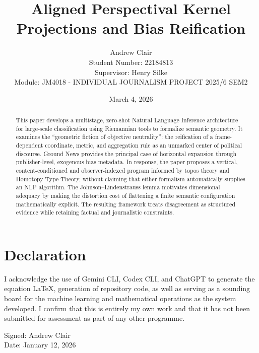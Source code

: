 \documentclass[12pt]{article}
\title{Aligned Perspectival Kernel Projections and Bias Reification}
\author{Andrew Clair \\
Student Number: 22184813 \\
Supervisor: Henry Silke \\
Module: JM4018 - INDIVIDUAL JOURNALISM PROJECT 2025/6 SEM2}
\date{March 4, 2026}
\begin{document}
\maketitle

\begin{abstract}
This paper develops a multistage, zero-shot Natural Language Inference architecture for large-scale classification using Riemannian tools to formalize semantic geometry. It examines the ``geometric fiction of objective neutrality'': the reification of a frame-dependent coordinate, metric, and aggregation rule as an unmarked center of political discourse. Ground News provides the principal case of horizontal expansion through publisher-level, exogenous bias metadata. In response, the paper proposes a vertical, content-conditioned and observer-indexed program informed by topos theory and Homotopy Type Theory, without claiming that either formalism automatically supplies an NLP algorithm. The Johnson--Lindenstrauss lemma motivates dimensional adequacy by making the distortion cost of flattening a finite semantic configuration mathematically explicit. The resulting framework treats disagreement as structured evidence while retaining factual and journalistic constraints.
\end{abstract}

\newpage

\section*{Declaration}
I acknowledge the use of Gemini CLI, Codex CLI, and ChatGPT to generate the equation LaTeX, generation of repository code, as well as serving as a sounding board for the machine learning and mathematical operations as the system developed. I confirm that this is entirely my own work and that it has not been submitted for assessment as part of any other programme.

\vspace{1cm}
Signed: Andrew Clair \\
Date: January 12, 2026

\newpage



% 
% 
% 
\end{document}
